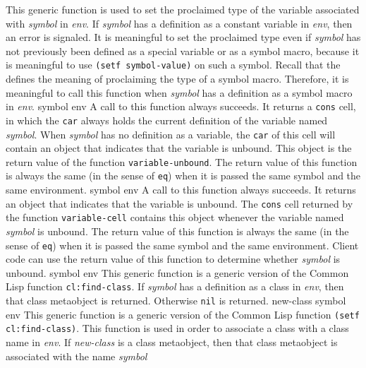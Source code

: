 \vskip -0.2cm
This generic function is used to set the proclaimed type of the
variable associated with \textit{symbol} in \textit{env}.
\vskip -0.05cm
If \textit{symbol} has a definition as a constant variable in \textit{env},
then an error is signaled.
\vskip -0.05cm
It is meaningful to set the proclaimed type even if \textit{symbol}
has not previously been defined as a special variable or as a symbol
macro, because it is meaningful to use \texttt{(setf symbol-value)} on
such a symbol.
\vskip -0.05cm
Recall that the \hs{} defines the meaning of proclaiming the
type of a symbol macro.  Therefore, it is meaningful to call this
function when \textit{symbol} has a definition as a symbol macro in
\textit{env}.
\vskip -0.05cm
 {symbol env}
\vskip -0.2cm
A call to this function always succeeds.  It returns a \texttt{cons}
cell, in which the \texttt{car} always holds the current definition of
the variable named \textit{symbol}.  When \textit{symbol} has no
definition as a variable, the \texttt{car} of this cell will contain
an object that indicates that the variable is unbound.  This object is
the return value of the function \texttt{variable-unbound}.  The
return value of this function is always the same (in the sense
of \texttt{eq}) when it is passed the same symbol and the same
environment.
\vskip -0.05cm
 {symbol env}
\vskip -0.2cm
A call to this function always succeeds.  It returns an object that
indicates that the variable is unbound.  The \texttt{cons} cell
returned by the function \texttt{variable-cell} contains this object
whenever the variable named \textit{symbol} is unbound.  The return
value of this function is always the same (in the sense
of \texttt{eq}) when it is passed the same symbol and the same
environment.  Client code can use the return value of this function to
determine whether
\textit{symbol} is unbound.
\vskip -0.05cm
 {symbol env}
\vskip -0.2cm
This generic function is a generic version of the Common Lisp
function \texttt{cl:find-class}.
\vskip -0.05cm
If \textit{symbol} has a definition as a class in \textit{env}, then that
class metaobject is returned.  Otherwise \texttt{nil} is returned.
\vskip -0.05cm
 {new-class symbol env}
\vskip -0.2cm
This generic function is a generic version of the Common Lisp
function \texttt{(setf cl:find-class)}.
\vskip -0.05cm
This function is used in order to associate a class with a class
name in \textit{env}.
\vskip -0.05cm
If \textit{new-class} is a class metaobject, then that class
metaobject is associated with the name \textit{symbol}
